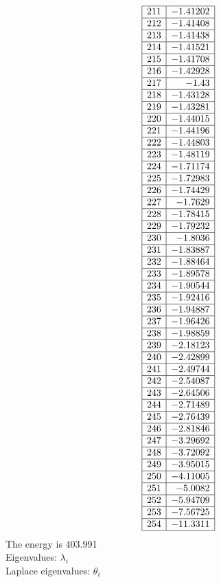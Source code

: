 \documentclass[12pt]{article}
\begin{document}
{$$\begin{array}{|r|r|}
\hline
211 & -1.41202\\
\hline
212 & -1.41408\\
\hline
213 & -1.41438\\
\hline
214 & -1.41521\\
\hline
215 & -1.41708\\
\hline
216 & -1.42928\\
\hline
217 & -1.43\\
\hline
218 & -1.43128\\
\hline
219 & -1.43281\\
\hline
220 & -1.44015\\
\hline
221 & -1.44196\\
\hline
222 & -1.44803\\
\hline
223 & -1.48119\\
\hline
224 & -1.71174\\
\hline
225 & -1.72983\\
\hline
226 & -1.74429\\
\hline
227 & -1.7629\\
\hline
228 & -1.78415\\
\hline
229 & -1.79232\\
\hline
230 & -1.8036\\
\hline
231 & -1.83887\\
\hline
232 & -1.88464\\
\hline
233 & -1.89578\\
\hline
234 & -1.90544\\
\hline
235 & -1.92416\\
\hline
236 & -1.94887\\
\hline
237 & -1.96426\\
\hline
238 & -1.98859\\
\hline
239 & -2.18123\\
\hline
240 & -2.42899\\
\hline
241 & -2.49744\\
\hline
242 & -2.54087\\
\hline
243 & -2.64506\\
\hline
244 & -2.71489\\
\hline
245 & -2.76439\\
\hline
246 & -2.81846\\
\hline
247 & -3.29692\\
\hline
248 & -3.72092\\
\hline
249 & -3.95015\\
\hline
250 & -4.11005\\
\hline
251 & -5.0082\\
\hline
252 & -5.94709\\
\hline
253 & -7.56725\\
\hline
254 & -11.3311\\
\hline
\end{array}
$$
The energy is 403.991\\
Eigenvalues: $\lambda_i$\\
Laplace eigenvalues: $\theta_i$\\


}
\end{document}
